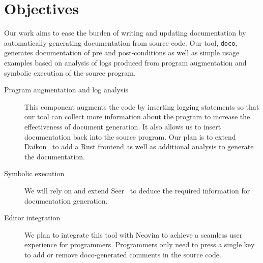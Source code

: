 \section{Objectives}

Our work aims to ease the burden of writing and updating documentation by automatically generating documentation from source code. Our tool, \texttt{doco}, generates documentation of pre and post-conditions as well as simple usage examples based on analysis of logs produced from program augmentation and symbolic execution of the source program.
\begin{description}
  \item [Program augmentation and log analysis] This component augments the code by inserting logging statements so that our tool can collect more information about the program to increase the effectiveness of document generation. It also allows us to insert documentation back into the source program. Our plan is to extend Daikon~\cite{Ernst:2007} to add a Rust frontend as well as additional analysis to generate the documentation.
  \item [Symbolic execution] We will rely on and extend Seer~\cite{Renshaw:2018} to deduce the required information for documentation generation.
  \item [Editor integration] We plan to integrate this tool with Neovim \cite{NeovimTeam:2018} to achieve a seamless user experience for programmers. Programmers only need to press a single key to add or remove doco-generated comments in the source code.
\end{description}
